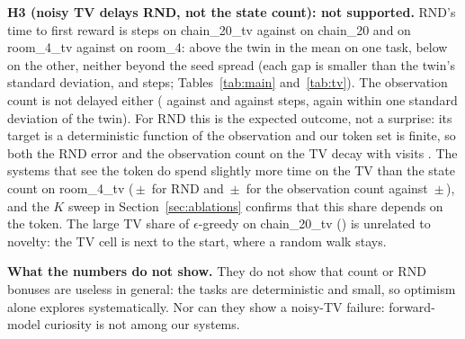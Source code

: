 \textbf{H3 (noisy TV delays RND, not the state count): not supported.} RND's time to first reward is  steps on chain\_20\_tv against  on chain\_20 and  on room\_4\_tv against  on room\_4: above the twin in the mean on one task, below on the other, neither beyond the seed spread (each gap is smaller than the twin's standard deviation,  and  steps; Tables~\ref{tab:main} and~\ref{tab:tv}). The observation count is not delayed either ( against  and  against  steps, again within one standard deviation of the twin). For RND this is the expected outcome, not a surprise: its target is a deterministic function of the observation and our token set is finite, so both the RND error and the observation count on the TV decay with visits \cite{burda2018exploration}. The systems that see the token do spend slightly more time on the TV than the state count on room\_4\_tv (\,$\pm$\, for RND and \,$\pm$\, for the observation count against \,$\pm$\,), and the $K$ sweep in Section~\ref{sec:ablations} confirms that this share depends on the token. The large TV share of $\epsilon$-greedy on chain\_20\_tv () is unrelated to novelty: the TV cell is next to the start, where a random walk stays.

\textbf{What the numbers do not show.} They do not show that count or RND bonuses are useless in general: the tasks are deterministic and small, so optimism alone explores systematically. Nor can they show a noisy-TV failure: forward-model curiosity is not among our systems.

